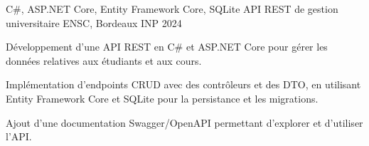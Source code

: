 
\begin{cventries}
  \cventry
    {C\#, ASP.NET Core, Entity Framework Core, SQLite}
    {API REST de gestion universitaire}
    {ENSC, Bordeaux INP}
    {2024}
    {
      \begin{cvitems}
        \item {Développement d’une API REST en C\# et ASP.NET Core pour gérer les données relatives aux étudiants et aux cours.}
        \item {Implémentation d’endpoints CRUD avec des contrôleurs et des DTO, en utilisant Entity Framework Core et SQLite pour la persistance et les migrations.}
        \item {Ajout d’une documentation Swagger/OpenAPI permettant d’explorer et d’utiliser l’API.}
      \end{cvitems}
    }
\end{cventries}
